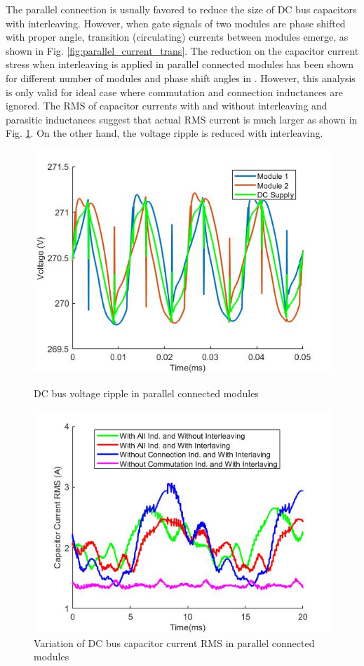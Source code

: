 The parallel connection is usually favored to reduce the size of DC bus capacitors with interleaving. However, when gate signals of two modules are phase shifted with proper angle, transition (circulating) currents between modules emerge, as shown in Fig. \ref{fig:parallel_current_trans}. The reduction on the capacitor current stress when interleaving is applied in parallel connected modules has been shown for different number of modules and phase shift angles in \cite{Ugur2017}. However, this analysis is only valid for ideal case where commutation and connection inductances are ignored. The RMS of capacitor currents with and without interleaving and parasitic inductances suggest that actual RMS current is much larger as shown in Fig. \ref{fig:parallel_curr_rms}. On the other hand, the voltage ripple is reduced with interleaving.

\begin{figure}[tb]
  \includegraphics[width=\linewidth]{figures/parallel_volt_ripple.jpg}
  \caption{DC bus voltage ripple in parallel connected modules }\label{fig:parallel_volt_ripple}
\endminipage\hfill
{}
  \includegraphics[width=\linewidth]{figures/parallel_curr_rms.jpg}
  \caption{Variation of DC bus capacitor current RMS in parallel connected modules}\label{fig:parallel_curr_rms}
\endminipage
\end{figure}

